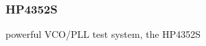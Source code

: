\documentclass{article}
\begin{document}
\subsubsection*{HP4352S}

powerful VCO/PLL test system, the HP4352S








\end{document}
